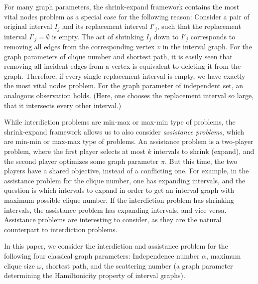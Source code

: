 For many graph parameters, the shrink-expand framework contains the most vital nodes problem as a special case for the following reason: Consider a pair of original interval $I_j$ and its replacement interval $I'_j$, such that the replacement interval $I'_j = \emptyset$ is empty. The act of shrinking $I_j$ down to $I'_j$ corresponds to removing all edges from the corresponding vertex $v$ in the interval graph. For the graph parameters of  clique number and shortest path, it is easily seen that removing all incident edges from a vertex is equivalent to deleting it from the graph. Therefore, if every single replacement interval is empty, we have exactly the most vital nodes problem. For the graph parameter of independent set, an analogous observation holds. (Here, one chooses the replacement interval so large, that it intersects every other interval.)


While interdiction problems are min-max or max-min type of problems, the shrink-expand framework allows us to also consider \emph{assistance problems}, which are min-min or max-max type of problems. An assistance problem is a two-player problem, where the first player selects at most $k$ intervals to shrink (expand), and the second player optimizes some graph parameter $\pi$. But this time, the two players have a shared objective, instead of a conflicting one. For example, in the assistance problem for the clique number, one has expanding intervals, and the question is which intervals to expand in order to get an interval graph with maximum possible clique number.
If the interdiction problem has shrinking intervals, the assistance problem has expanding intervals, and vice versa. Assistance problems are interesting to consider, as they are the natural counterpart to interdiction problems. 

In this paper, we consider the interdiction and assistance problem for the following 
four classical graph parameters: 
Independence number $\alpha$, maximum clique size $\omega$, shortest path, 
and the scattering number (a graph parameter determining the Hamiltonicity property of interval graphs). 

